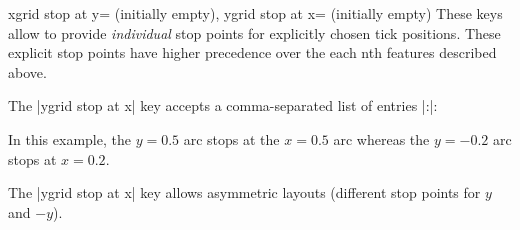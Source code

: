 \begin{pgfplotskeylist}{%
    xgrid stop at y= (initially empty),
    ygrid stop at x= (initially empty)%
}
    These keys allow to provide \emph{individual} stop points for explicitly
    chosen tick positions. These explicit stop points have higher precedence
    over the each nth features described above.

    The |ygrid stop at x| key accepts a comma-separated list of entries |:|:
\begin{codeexample}[]
\begin{tikzpicture}
\begin{smithchart}[
    ygrid stop at x={0.5:0.5,-0.2:0.2}
]
    \end{smithchart}
\end{tikzpicture}
\end{codeexample}
    \noindent In this example, the $y=0.5$ arc stops at the $x=0.5$ arc whereas
    the $y=-0.2$ arc stops at $x=0.2$.

    The |ygrid stop at x| key allows asymmetric layouts (different stop points
    for $y$ and $-y$).
\end{pgfplotskeylist}
\endgroup
